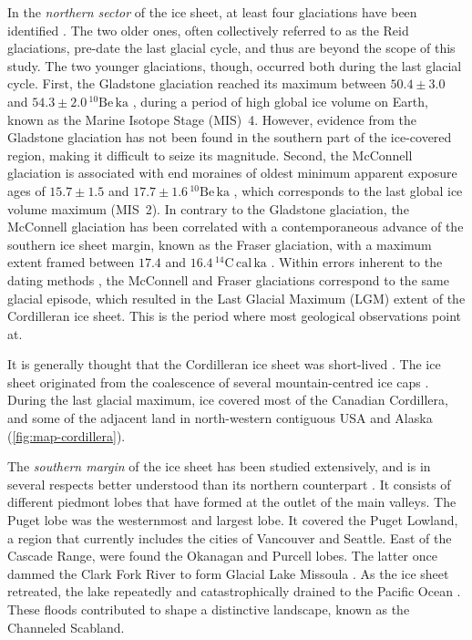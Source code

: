 \documentclass{article}
\newcommand{\unit}[1]{\ensuremath{\mathrm{#1}}}
\begin{document}
In the \emph{northern sector} of the ice sheet, at least four glaciations have
been identified
    \citep{Duk-Rodkin.1999, Ward.etal.2007, Ward.etal.2008,
           Briner.Kaufman.2008, Demuro.etal.2012,
           Stroeven.etal.2010, Stroeven.etal.2014}.
The two older ones, often collectively referred to as the Reid glaciations,
pre-date the last glacial cycle, and thus are beyond the scope of this study.
The two younger glaciations, though, occurred both during the last glacial
cycle. First, the Gladstone glaciation reached its maximum between
$50.4\pm3.0$ and $54.3\pm2.0$\,\unit{^{10}Be\,ka} \citep{Ward.etal.2007},
during a period of high global ice volume on Earth, known as the Marine Isotope
Stage (MIS)~4. However, evidence from the Gladstone glaciation has not been
found in the southern part of the ice-covered region, making it difficult to
seize its magnitude. Second, the McConnell glaciation is associated with end
moraines of oldest minimum apparent exposure ages of
$15.7\pm1.5$ and $17.7\pm1.6$\,\unit{^{10}Be\,ka} \citep{Stroeven.etal.2014},
which corresponds to the last global ice volume maximum (MIS~2). In contrary to
the Gladstone glaciation, the McConnell glaciation has been correlated with a
contemporaneous advance of the southern ice sheet margin, known as the Fraser
glaciation, with a maximum extent framed between
$17.4$ and $16.4$\,\unit{^{14}C\,cal\,ka} \citep[Fig.~4]{Porter.Swanson.1998}.
Within errors inherent to the dating methods \citep{Heyman.etal.2011}, the
McConnell and Fraser glaciations correspond to the same glacial episode, which
resulted in the Last Glacial Maximum (LGM) extent of the Cordilleran ice sheet.
This is the period where most geological observations point at.

It is generally thought that the Cordilleran ice sheet was short-lived
    \citep[e.g.]{Clague.etal.1980, Clague.1985, Cosma.etal.2008}.
The ice sheet originated from the
coalescence of several mountain-centred ice caps \citep{Davis.Mathews.1944}.
During the last glacial maximum, ice covered most of the
Canadian Cordillera, and some of the adjacent land in north-western contiguous
USA and Alaska (\cref{fig:map-cordillera}).

The \emph{southern margin} of the ice sheet has been studied extensively, and
is in several respects better understood than its northern counterpart
\citep{Booth.etal.2003}. It consists of different piedmont
lobes that have formed at the outlet of the main valleys. The Puget lobe
\citep[e.g.]{Thorson.1980, Porter.Swanson.1998} was the westernmost and
largest lobe. It covered the Puget Lowland, a region that currently includes
the cities of Vancouver and Seattle. East of the Cascade Range, were found the
Okanagan and Purcell lobes. The latter once dammed the Clark Fork River to form
Glacial Lake Missoula \citep{Pardee.1910}. As the ice sheet retreated, the lake
repeatedly and catastrophically drained to the Pacific Ocean
\citep{Bretz.1923,Waitt.1980}. These floods
contributed to shape a distinctive landscape, known as the Channeled Scabland.
\end{document}
